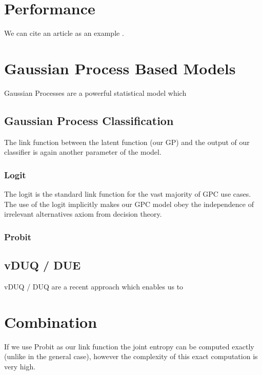 \documentclass[12pt, a4paper]{report}
\begin{document}
\chapter{Performance}
\label{Chap3}
We can cite an article as an example \cite{kirsch2019batchbald}. 


\chapter{Gaussian Process Based Models}
\label{Chap4}

Gaussian Processes are a powerful statistical model which 


\section{Gaussian Process Classification}

The link function between the latent function (our GP) and the output of our classifier is again another parameter of the model.

\subsection{Logit}

The logit is the standard link function for the vast majority of GPC use cases. The use of the logit implicitly makes our GPC model obey the independence of irrelevant alternatives axiom from decision theory. 


\subsection{Probit}



\section{vDUQ / DUE}

vDUQ / DUQ \cite{vanamersfoort2020uncertainty} are a recent approach which enables us to 

\chapter{Combination}
\label{Chap5}

If we use Probit as our link function the joint entropy can be computed exactly (unlike in the general case), however the complexity of this exact computation is very high.
\end{document}
